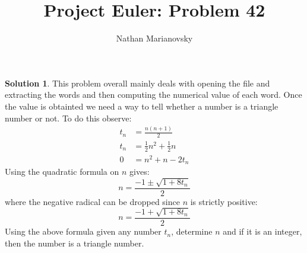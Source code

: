 \documentclass[12pt, letterpaper, onecolumn, conference, final]{IEEEtran}
\title{Project Euler: Problem 42}
\author{Nathan Marianovsky}
\theoremstyle{definition}
\newtheorem*{problem*}{Problem}
\newtheorem*{solution*}{Solution}
\theoremstyle{plain}
\begin{document}
\maketitle

\begin{center}
\end{center}

\vspace{.3cm}
\begin{solution*}
This problem overall mainly deals with opening the file and extracting the words and then computing the numerical value of each word. Once the value is obtainted we need a way to tell whether a number is a triangle number or not. To do this observe:
\begin{equation*}
\begin{split}
t_n &= \frac{n(n+1)}{2} \\
t_n &= \frac{1}{2}n^2 + \frac{1}{2}n \\
0 &= n^2 + n - 2t_n
\end{split}
\end{equation*}
Using the quadratic formula on $n$ gives:
\begin{equation*}
n = \frac{-1 \pm \sqrt{1 + 8t_n}}{2}
\end{equation*}
where the negative radical can be dropped since $n$ is strictly positive:
\begin{equation*}
n = \frac{-1 + \sqrt{1 + 8t_n}}{2}
\end{equation*}
Using the above formula given any number $t_n$, determine $n$ and if it is an integer, then the number is a triangle number.
\end{solution*}
\end{document}
